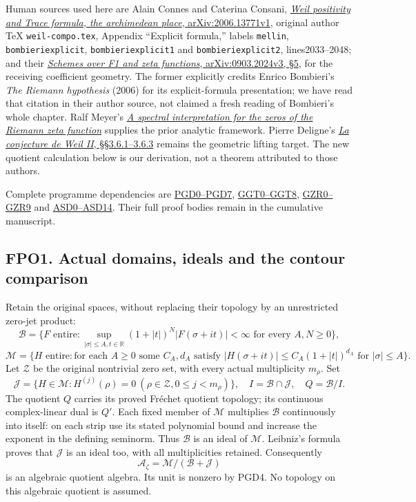 Human sources used here are Alain Connes and Caterina Consani,
\href{https://arxiv.org/abs/2006.13771v1}{\emph{Weil positivity and
Trace formula, the archimedean place}, arXiv:2006.13771v1}, original
author TeX \nolinkurl{weil-compo.tex}, Appendix ``Explicit formula,''
labels \texttt{mellin}, \texttt{bombieriexplicit},
\texttt{bombieriexplicit1} and \texttt{bombieriexplicit2},
lines2033--2048; and their
\href{https://arxiv.org/abs/0903.2024v3}{\emph{Schemes over F1 and zeta
functions}, arXiv:0903.2024v3, §5}, for the receiving coefficient
geometry. The former explicitly credits Enrico Bombieri's \emph{The
Riemann hypothesis} (2006) for its explicit-formula presentation; we
have read that citation in their author source, not claimed a fresh
reading of Bombieri's whole chapter. Ralf Meyer's
\href{https://arxiv.org/abs/math/0412277v3}{\emph{A spectral
interpretation for the zeros of the Riemann zeta function}} supplies the
prior analytic framework. Pierre Deligne's
\href{https://www.numdam.org/item/PMIHES_1980__52__137_0/}{\emph{La
conjecture de Weil II}, §§3.6.1--3.6.3} remains the geometric lifting
target. The new quotient calculation below is our derivation, not a
theorem attributed to those authors.

Complete programme dependencies are
\href{GLOBAL_POLYNOMIAL_DUAL_DEFECT.md}{PGD0--PGD7},
\href{GLOBAL_GAUSSIAN_ORIGINAL_ZETA_TRACE.md}{GGT0--GGT8},
\href{GLOBAL_ORIGINAL_ZETA_RESIDUE_DUALITY_INDEPENDENT.md}{GZR0--GZR9}
and \href{ACTUAL_SUPPORTED_DUALITY_INDEPENDENT.md}{ASD0--ASD14}. Their
full proof bodies remain in the cumulative manuscript.

\subsection{FPO1. Actual domains, ideals and the contour
comparison}\label{fpo1.-actual-domains-ideals-and-the-contour-comparison}

Retain the original spaces, without replacing their topology by an
unrestricted zero-jet product: \[
\mathcal B=\{F\text{ entire}:\sup_{|\sigma|\le A,t\in\mathbb R}
 (1+|t|)^N|F(\sigma+it)|<\infty\text{ for every }A,N\ge0\},
\] \[
\mathcal M=\{H\text{ entire}:\text{for each }A\ge0\text{ some }C_A,d_A
 \text{ satisfy }|H(\sigma+it)|\le C_A(1+|t|)^{d_A}
 \text{ for }|\sigma|\le A\}.
\tag{FPO1.1}
\] Let \(\mathscr Z\) be the original nontrivial zero set, with every
actual multiplicity \(m_\rho\). Set \[
\mathcal J=\{H\in\mathcal M:H^{(j)}(\rho)=0\ (\rho\in\mathscr Z,0\le j<m_\rho)\},
\quad I=\mathcal B\cap\mathcal J,
\quad Q=\mathcal B/I.
\tag{FPO1.2}
\] The quotient \(Q\) carries its proved Fréchet quotient topology; its
continuous complex-linear dual is \(Q'\). Each fixed member of
\(\mathcal M\) multiplies \(\mathcal B\) continuously into itself: on
each strip use its stated polynomial bound and increase the exponent in
the defining seminorm. Thus \(\mathcal B\) is an ideal of
\(\mathcal M\). Leibniz's formula proves that \(\mathcal J\) is an ideal
too, with all multiplicities retained. Consequently \[
\mathcal A_\zeta=\mathcal M/(\mathcal B+\mathcal J)
\tag{FPO1.3}
\] is an algebraic quotient algebra. Its unit is nonzero by PGD4. No
topology on this algebraic quotient is assumed.

